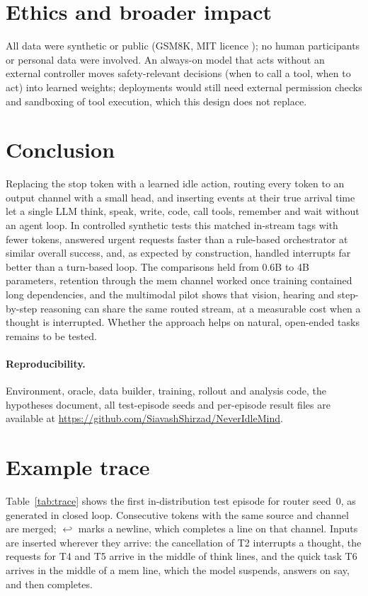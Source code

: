 \documentclass[10pt]{article}
\begin{document}
\section{Ethics and broader impact}
All data were synthetic or public (GSM8K, MIT licence \citep{cobbe2021gsm8k}); no human participants or personal data were involved. An always-on model that acts without an external controller moves safety-relevant decisions (when to call a tool, when to act) into learned weights; deployments would still need external permission checks and sandboxing of tool execution, which this design does not replace.

\section{Conclusion}
Replacing the stop token with a learned idle action, routing every token to an output channel with a small head, and inserting events at their true arrival time let a single LLM think, speak, write, code, call tools, remember and wait without an agent loop. In controlled synthetic tests this matched in-stream tags with fewer tokens, answered urgent requests faster than a rule-based orchestrator at similar overall success, and, as expected by construction, handled interrupts far better than a turn-based loop. The comparisons held from 0.6B to 4B parameters, retention through the mem channel worked once training contained long dependencies, and the multimodal pilot shows that vision, hearing and step-by-step reasoning can share the same routed stream, at a measurable cost when a thought is interrupted. Whether the approach helps on natural, open-ended tasks remains to be tested.

\paragraph{Reproducibility.} Environment, oracle, data builder, training, rollout and analysis code, the hypotheses document, all test-episode seeds and per-episode result files are available at \url{https://github.com/SiavashShirzad/NeverIdleMind}.




\appendix
\section{Example trace}\label{app:trace}
Table~\ref{tab:trace} shows the first in-distribution test episode for router seed~0, as generated in closed loop. Consecutive tokens with the same source and channel are merged; $\hookleftarrow$ marks a newline, which completes a line on that channel. Inputs are inserted wherever they arrive: the cancellation of T2 interrupts a thought, the requests for T4 and T5 arrive in the middle of think lines, and the quick task T6 arrives in the middle of a mem line, which the model suspends, answers on say, and then completes.
\begin{table}[h]
\centering\scriptsize
\caption{Closed-loop trace (router, seed 0, test episode 0).}
\label{tab:trace}

\end{table}
\end{document}
